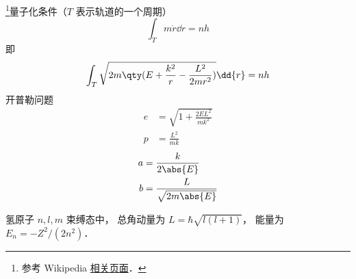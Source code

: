 
\begin{issues}
\issueDraft
\end{issues}

\footnote{参考 Wikipedia \href{https://en.wikipedia.org/wiki/Bohr_model}{相关页面}．}量子化条件（$T$ 表示轨道的一个周期）
\begin{equation}
\int_T m\dot r \dd{r} = nh
\end{equation}
即
\begin{equation}
\int_T \sqrt{2m\qty(E + \frac{k^2}{r} - \frac{L^2}{2mr^2})} \dd{r} = nh
\end{equation}
开普勒问题
\begin{align}
e &= \sqrt{1 + \frac{2EL^2}{mk^2}}\\
p &= \frac{L^2}{mk}
\end{align}
\begin{align}
a &= \frac{k}{2\abs{E}}\\
b &= \frac{L}{\sqrt{2m\abs{E}}}
\end{align}

氢原子 $n,l,m$ 束缚态中， 总角动量为 $L = \hbar\sqrt{l(l+1)}$， 能量为 $E_n = -Z^2/(2n^2)$．
